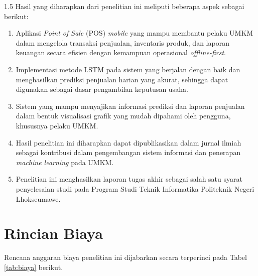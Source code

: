 \documentclass[12pt, a4paper, onecolumn, oneside]{report}
\begin{document}
\begin{spacing}{1.5}
Hasil yang diharapkan dari penelitian ini meliputi beberapa aspek sebagai berikut:
\begin{enumerate}
    \item Aplikasi \textit{Point of Sale} (POS) \textit{mobile} yang mampu membantu pelaku UMKM dalam mengelola transaksi penjualan, inventaris produk, dan laporan keuangan secara efisien dengan kemampuan operasional \textit{offline-first}.
    \item Implementasi metode LSTM pada sistem yang berjalan dengan baik dan menghasilkan prediksi penjualan harian yang akurat, sehingga dapat digunakan sebagai dasar pengambilan keputusan usaha.
    \item Sistem yang mampu menyajikan informasi prediksi dan laporan penjualan dalam bentuk visualisasi grafik yang mudah dipahami oleh pengguna, khususnya pelaku UMKM.
    \item Hasil penelitian ini diharapkan dapat dipublikasikan dalam jurnal ilmiah sebagai kontribusi dalam pengembangan sistem informasi dan penerapan \textit{machine learning} pada UMKM.
    \item Penelitian ini menghasilkan laporan tugas akhir sebagai salah satu syarat penyelesaian studi pada Program Studi Teknik Informatika Politeknik Negeri Lhokseumawe.
\end{enumerate}

\section{Rincian Biaya}

Rencana anggaran biaya penelitian ini dijabarkan secara terperinci pada Tabel \ref{tab:biaya} berikut.


\end{spacing}
\end{document}
